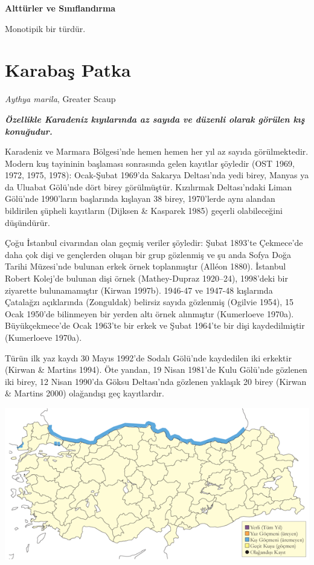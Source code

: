 \documentclass[
  letterpaper,
  DIV=11,
  numbers=noendperiod]{scrreprt}
\begin{document}
\textbf{Alttürler ve Sınıflandırma}

Monotipik bir türdür.

\section{Karabaş Patka}\label{karabaux15f-patka}

\emph{Aythya marila}, Greater Scaup

\textbf{\emph{Özellikle Karadeniz kıyılarında az sayıda ve düzenli
olarak görülen kış konuğudur.}}

Karadeniz ve Marmara Bölgesi'nde hemen hemen her yıl az sayıda
görülmektedir. Modern kuş tayininin başlaması sonrasında gelen kayıtlar
şöyledir (OST 1969, 1972, 1975, 1978): Ocak-Şubat 1969'da Sakarya
Deltası'nda yedi birey, Manyas ya da Uluabat Gölü'nde dört birey
görülmüştür. Kızılırmak Deltası'ndaki Liman Gölü'nde 1990'ların
başlarında kışlayan 38 birey, 1970'lerde aynı alandan bildirilen şüpheli
kayıtların (Dijksen \& Kasparek 1985) geçerli olabileceğini düşündürür.

Çoğu İstanbul civarından olan geçmiş veriler şöyledir: Şubat 1893'te
Çekmece'de daha çok dişi ve gençlerden oluşan bir grup gözlenmiş ve şu
anda Sofya Doğa Tarihi Müzesi'nde bulunan erkek örnek toplanmıştır
(Alléon 1880). İstanbul Robert Kolej'de bulunan dişi örnek
(Mathey-Dupraz 1920--24), 1998'deki bir ziyarette bulunamamıştır (Kirwan
1997b). 1946-47 ve 1947-48 kışlarında Çatalağzı açıklarında (Zonguldak)
belirsiz sayıda gözlenmiş (Ogilvie 1954), 15 Ocak 1950'de bilinmeyen bir
yerden altı örnek alınmıştır (Kumerloeve 1970a). Büyükçekmece'de Ocak
1963'te bir erkek ve Şubat 1964'te bir dişi kaydedilmiştir (Kumerloeve
1970a).

Türün ilk yaz kaydı 30 Mayıs 1992'de Sodalı Gölü'nde kaydedilen iki
erkektir (Kirwan \& Martins 1994). Öte yandan, 19 Nisan 1981'de Kulu
Gölü'nde gözlenen iki birey, 12 Nisan 1990'da Göksu Deltası'nda gözlenen
yaklaşık 20 birey (Kirwan \& Martins 2000) olağandışı geç kayıtlardır.

\includegraphics{images/harita_Page_026.png}
\end{document}
